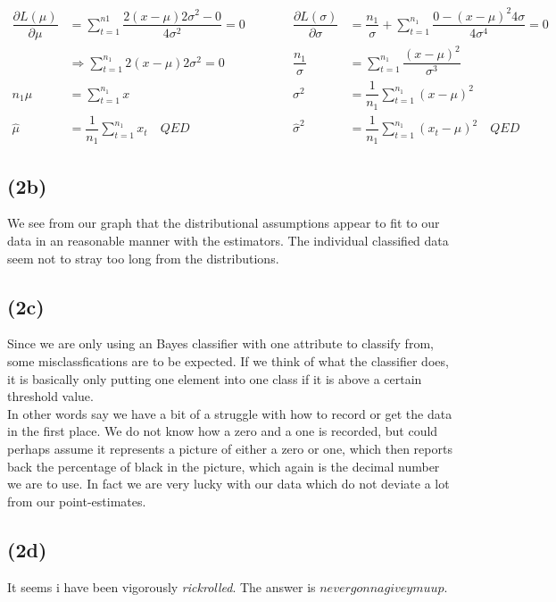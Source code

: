 \documentclass[12pt, letterpaper]{article}
\begin{document}
      \begin{align*}
        \dfrac{\partial L(\mu)}{\partial \mu} & =\sum_{t=1}^{n1}\dfrac{2(x - \mu)2\sigma^2 - 0}{4\sigma^2} = 0 \quad&\quad\quad \dfrac{\partial L(\sigma)}{\partial\sigma} & = \dfrac{n_1}{\sigma} + \sum_{t=1}^{n_1} \dfrac{0 - (x - \mu)^2 4\sigma}{4\sigma^4}  = 0
        \\
        & \Rightarrow \sum_{t=1}^{n_1} 2(x - \mu)2\sigma^2 = 0 \quad&\quad\quad
        \dfrac{n_1}{\sigma} & = \sum_{t=1}^{n_1} \dfrac{(x-\mu)^2}{\sigma^3}
        \\
        n_1\mu & = \sum_{t=1}^{n_1} x \quad&\quad\quad \sigma^2 &= \dfrac{1}{n_1}\sum_{t=1}^{n_1} (x-\mu)^2
        \\
        \hat{\mu} & = \dfrac{1}{n_1}\sum_{t=1}^{n_1} x_t \quad QED &\quad\quad
        \hat{\sigma}^2 &= \dfrac{1}{n_1}\sum_{t=1}^{n_1} (x_t-\mu)^2 \quad QED
      \end{align*}
    \subsection*{(2b)}
      We see from our graph that the distributional assumptions appear to fit to our data in an reasonable manner with the estimators. The individual classified data seem not to stray too long from the distributions.
    \subsection*{(2c)}
      Since we are only using an Bayes classifier with one attribute to classify from, some misclassfications are to be expected. If we think of what the classifier does, it is basically only putting one element into one class if it is above a certain threshold value.\\
      In other words say we have a bit of a struggle with how to record or get the data in the first place. We do not know how a zero and a one is recorded, but could perhaps assume it represents a picture of either a zero or one, which then reports back the percentage of black in the picture, which again is the decimal number we are to use. In fact we are very lucky with our data which do not deviate a lot from our point-estimates.
    \subsection*{(2d)}
      It seems i have been vigorously \textit{rickrolled}. The answer is \underline{\underline{$nevergonnagiveymuup$}}.
\end{document}
